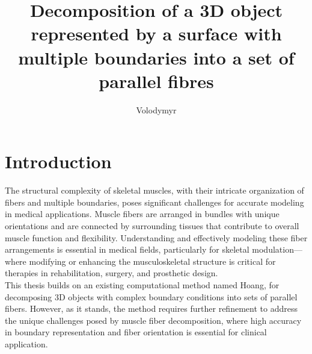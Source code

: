\documentclass[english, bc, kiv, he, iso690alph, pdf, viewonly]{fasthesis}
\title{Decomposition of a 3D object represented by a surface with multiple boundaries into a set of parallel
fibres}
\author{Volodymyr}{Pavlov}{}{}
\begin{document}
\frontpages[tm] %
\tableofcontents
% 
%
\makeatletter%
\ifx\FASThesis@style\c@fullcolor%
\else%
\fi%
\makeatother%
%
%
%
%
\chapter{Introduction}

The structural complexity of skeletal muscles, with their intricate organization of fibers and multiple boundaries, poses significant challenges for accurate modeling in medical applications. Muscle fibers are arranged in bundles with unique orientations and are connected by surrounding tissues that contribute to overall muscle function and flexibility. Understanding and effectively modeling these fiber arrangements is essential in medical fields, particularly for skeletal modulation—where modifying or enhancing the musculoskeletal structure is critical for therapies in rehabilitation, surgery, and prosthetic design.
\\

This thesis builds on an existing computational method named Hoang, for decomposing 3D objects with complex boundary conditions into sets of parallel fibers. However, as it stands, the method requires further refinement to address the unique challenges posed by muscle fiber decomposition, where high accuracy in boundary representation and fiber orientation is essential for clinical application. 
\\
\end{document}
